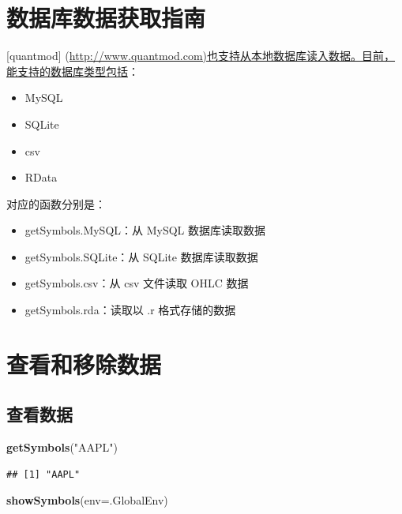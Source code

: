 \documentclass[]{ctexbook}
\newenvironment{Shaded}{\begin{snugshade}}{\end{snugshade}}
\newcommand{\AttributeTok}[1]{\textcolor[rgb]{0.13,0.29,0.53}{#1}}
\newcommand{\FunctionTok}[1]{\textcolor[rgb]{0.13,0.29,0.53}{\textbf{#1}}}
\newcommand{\NormalTok}[1]{#1}
\newcommand{\StringTok}[1]{\textcolor[rgb]{0.31,0.60,0.02}{#1}}
\providecommand{\tightlist}{%
  \setlength{\itemsep}{0pt}\setlength{\parskip}{0pt}}
\begin{document}
\section{数据库数据获取指南}\label{ux6570ux636eux5e93ux6570ux636eux83b7ux53d6ux6307ux5357}

{[}quantmod{]} (\url{http://www.quantmod.com)也支持从本地数据库读入数据。目前，能支持的数据库类型包括}：

\begin{itemize}
\tightlist
\item
  MySQL
\item
  SQLite
\item
  csv
\item
  RData
\end{itemize}

对应的函数分别是：

\begin{itemize}
\tightlist
\item
  getSymbols.MySQL：从 MySQL 数据库读取数据
\item
  getSymbols.SQLite：从 SQLite 数据库读取数据
\item
  getSymbols.csv：从 csv 文件读取 OHLC 数据
\item
  getSymbols.rda：读取以 .r 格式存储的数据
\end{itemize}

\section{查看和移除数据}\label{ux67e5ux770bux548cux79fbux9664ux6570ux636e}

\subsection{查看数据}\label{ux67e5ux770bux6570ux636e}

\begin{Shaded}
\begin{Highlighting}[]
\FunctionTok{getSymbols}\NormalTok{(}\StringTok{"AAPL"}\NormalTok{)}
\end{Highlighting}
\end{Shaded}

\begin{verbatim}
## [1] "AAPL"
\end{verbatim}

\begin{Shaded}
\begin{Highlighting}[]
\FunctionTok{showSymbols}\NormalTok{(}\AttributeTok{env=}\NormalTok{.GlobalEnv)}
\end{Highlighting}
\end{Shaded}
\end{document}
